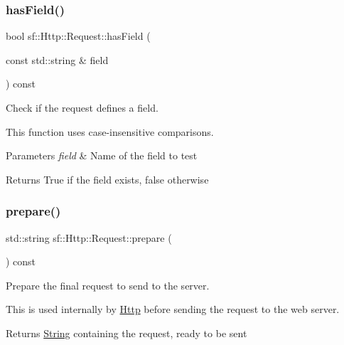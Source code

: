 \subsubsection{\texorpdfstring{hasField()}{hasField()}}
{\footnotesize\ttfamily bool sf\+::\+Http\+::\+Request\+::has\+Field (\begin{DoxyParamCaption}\item[{const std\+::string \&}]{field }\end{DoxyParamCaption}) const\hspace{0.3cm}{\ttfamily [private]}}



Check if the request defines a field. 

This function uses case-\/insensitive comparisons.


\begin{DoxyParams}{Parameters}
{\em field} & Name of the field to test\\
\hline
\end{DoxyParams}
\begin{DoxyReturn}{Returns}
True if the field exists, false otherwise \begin{DoxyVerb}\end{DoxyVerb}
 
\end{DoxyReturn}
\mbox{\label{classsf_1_1_http_1_1_request_a4f53faef789d95aa21d72264adc74fba}} 
\subsubsection{\texorpdfstring{prepare()}{prepare()}}
{\footnotesize\ttfamily std\+::string sf\+::\+Http\+::\+Request\+::prepare (\begin{DoxyParamCaption}{ }\end{DoxyParamCaption}) const\hspace{0.3cm}{\ttfamily [private]}}



Prepare the final request to send to the server. 

This is used internally by \mbox{\hyperlink{classsf_1_1_http}{Http}} before sending the request to the web server.

\begin{DoxyReturn}{Returns}
\mbox{\hyperlink{classsf_1_1_string}{String}} containing the request, ready to be sent \begin{DoxyVerb}\end{DoxyVerb}
 
\end{DoxyReturn}
\mbox{\label{classsf_1_1_http_1_1_request_ae9f61ec3fa1639c70e9b5780cb35578e}} 
